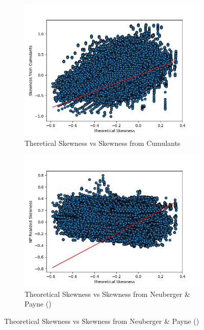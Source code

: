 \begin{figure}
    \centering
    \begin{subfigure}[b]{0.4\textwidth}
        \centering
        \includegraphics[width=\textwidth]{img/theoretical_skewness_vs_skewness_from_cumulants_feller_condition_true.png}
        \caption{Theretical Skewness vs Skewness from Cumulants}
    \end{subfigure}
    \hfill
    \begin{subfigure}[b]{0.4\textwidth}
        \centering
        \includegraphics[width=\textwidth]{img/theoretical_skewness_vs_NP_rskewness_feller_condition_true.png}
        \caption{Theoretical Skewness vs Skewness from Neuberger \& Payne (\citeyear{neubergerSkewnessStockMarket2021})}

\end{subfigure}
\end{figure}

